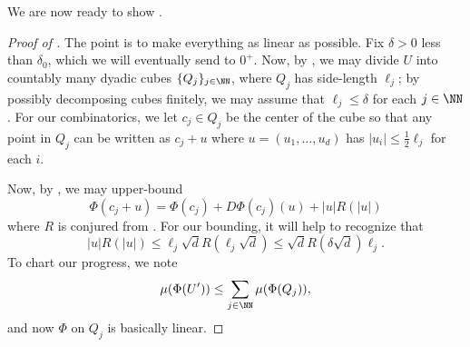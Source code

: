 \documentclass[../notes.tex]{subfiles}
\begin{document}
We are now ready to show .
\begin{proof}[Proof of ]
	The point is to make everything as linear as possible. Fix $\delta>0$ less than $\delta_0$, which we will eventually send to $0^+$. Now, by , we may divide $U$ into countably many dyadic cubes $\{Q_j\}_{j\in\NN}$, where $Q_j$ has side-length $\ell_j$; by possibly decomposing cubes finitely, we may assume that $\ell_j\le\delta$ for each $j\in\NN$. For our combinatorics, we let $c_j\in Q_j$ be the center of the cube so that any point in $Q_j$ can be written as $c_j+u$ where $u=(u_1,\ldots,u_d)$ has $\left|u_i\right|\le\frac12\ell_j$ for each $i$.
	
	Now, by , we may upper-bound
	\[\Phi(c_j+u)=\Phi(c_j)+D\Phi(c_j)(u)+\left|u\right|R(\left|u\right|)\]
	where $R$ is conjured from . For our bounding, it will help to recognize that
	\[\left|u\right|R(\left|u\right|)\le\ell_j\sqrt dR(\ell_j\sqrt d)\le\sqrt dR(\delta\sqrt d)\ell_j.\]
	To chart our progress, we note
	\[\mu(\Phi(U'))\le\sum_{j\in\NN}\mu(\Phi(Q_j)),\]
	and now $\Phi$ on $Q_j$ is basically linear.
\end{proof}
\end{document}
